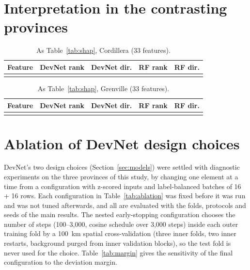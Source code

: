 \documentclass[pdflatex,sn-apa]{sn-jnl}
\begin{document}
\begin{appendices}
\section{Interpretation in the contrasting provinces}\label{app:shap}

\begin{table}[!h]
\caption{As Table~\ref{tab:shap}, Cordillera (33 features).}\label{tab:shap-cord}
\footnotesize
\begin{tabular*}{\textwidth}{@{\extracolsep\fill}lcccc}
\toprule
Feature & DevNet rank & DevNet dir. & RF rank & RF dir. \\
\midrule
\botrule
\end{tabular*}
\end{table}

\begin{table}[!h]
\caption{As Table~\ref{tab:shap}, Grenville (33 features).}\label{tab:shap-gren}
\footnotesize
\begin{tabular*}{\textwidth}{@{\extracolsep\fill}lcccc}
\toprule
Feature & DevNet rank & DevNet dir. & RF rank & RF dir. \\
\midrule
\botrule
\end{tabular*}
\end{table}

\section{Ablation of DevNet design choices}\label{app:sensitivity}

DevNet's two design choices (Section~\ref{sec:models}) were settled with diagnostic experiments on the three provinces of this study, by changing one element at a time from a configuration with z-scored inputs and label-balanced batches of 16 + 16 rows. Each configuration in Table~\ref{tab:ablation} was fixed before it was run and was not tuned afterwards, and all are evaluated with the folds, protocols and seeds of the main results. The nested early-stopping configuration chooses the number of steps (100--3,000, cosine schedule over 3,000 steps) inside each outer training fold by a 100~km spatial cross-validation (three inner folds, two inner restarts, background purged from inner validation blocks), so the test fold is never used for the choice. Table~\ref{tab:margin} gives the sensitivity of the final configuration to the deviation margin.


\end{appendices}
\end{document}
